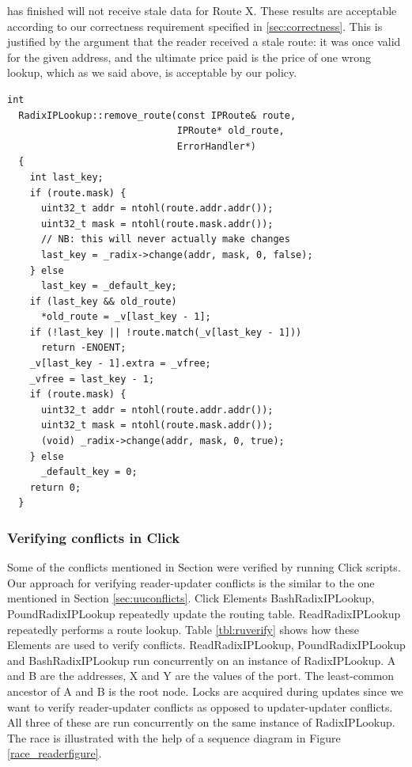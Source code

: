 \documentclass[a4paper]{article}
\begin{document}
has finished will not receive stale data for Route X. These results are acceptable according
to our correctness requirement specified in \ref{sec:correctness}.
This is justified by the argument that the reader received
a stale route: it was once valid for the given address, and the
ultimate price paid is the price of one wrong lookup, which as we said above, is acceptable by our policy.
\begin{lstlisting}[caption= The remove\_route() function, label=removeroute,float=tph]
  int
  RadixIPLookup::remove_route(const IPRoute& route, 
                              IPRoute* old_route, 
                              ErrorHandler*)
  {
    int last_key;
    if (route.mask) {
      uint32_t addr = ntohl(route.addr.addr());
      uint32_t mask = ntohl(route.mask.addr());
      // NB: this will never actually make changes
      last_key = _radix->change(addr, mask, 0, false);
    } else
      last_key = _default_key;
    if (last_key && old_route)
      *old_route = _v[last_key - 1];
    if (!last_key || !route.match(_v[last_key - 1]))
      return -ENOENT;
    _v[last_key - 1].extra = _vfree;
    _vfree = last_key - 1;
    if (route.mask) {
      uint32_t addr = ntohl(route.addr.addr());
      uint32_t mask = ntohl(route.mask.addr());
      (void) _radix->change(addr, mask, 0, true);
    } else
      _default_key = 0;
    return 0;
  }
\end{lstlisting}

\subsubsection{Verifying conflicts in Click}
Some of the conflicts mentioned in Section were verified by running Click scripts. Our approach for verifying reader-updater conflicts is the similar to the one mentioned in Section \ref{sec:uuconflicts}. Click Elements BashRadixIPLookup, PoundRadixIPLookup repeatedly update the routing table. ReadRadixIPLookup repeatedly performs a route lookup. Table \ref{tbl:ruverify} shows how these Elements are used to verify conflicts. ReadRadixIPLookup, PoundRadixIPLookup and BashRadixIPLookup run concurrently on an instance of RadixIPLookup. A and B are the addresses, X and Y are the values of the port. The least-common ancestor of A and B is the root node. Locks are acquired during updates since we want to verify reader-updater conflicts as opposed to updater-updater conflicts. All three of these are run concurrently on the same instance of RadixIPLookup. The race is illustrated with the help of a sequence diagram in Figure \ref{race_readerfigure}.\\
\end{document}
